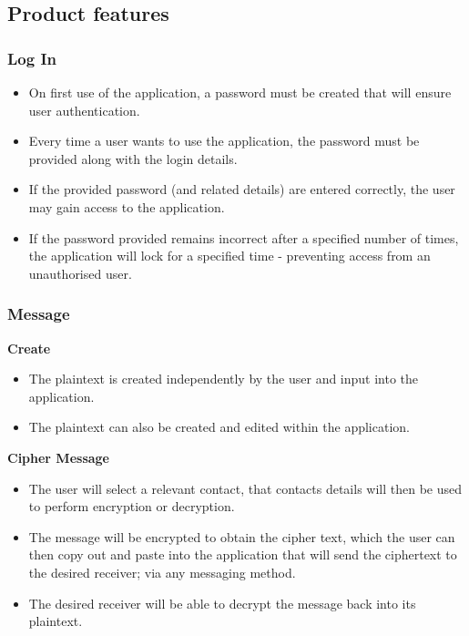 \subsection{Product features}
\subsubsection{Log In}
\begin{itemize}
\item On first use of the application, a password must be created that will ensure user authentication.
\item Every time a user wants to use the application, the password must be provided along with the login details.
\item If the provided password (and related details) are entered correctly, the user may gain access to the application.
\item If the password provided remains incorrect after a specified number of times, the application will lock for a specified time - preventing access from an unauthorised user.
\end{itemize}
\subsubsection{Message}
\textbf{Create}
\begin{itemize}
\item The plaintext is created independently by the user and input into the application.
\item The plaintext can also be created and edited within the application.
\end{itemize}
\textbf{Cipher Message}
\begin{itemize}
\item The user will select a relevant contact, that contacts details will then be used to perform encryption or decryption.
\item The message will be encrypted to obtain the cipher text, which the user can then copy out and paste into the application that will send the ciphertext to the desired receiver; via any messaging method.
\item The desired receiver will be able to decrypt the message back into its plaintext.
\end{itemize}

